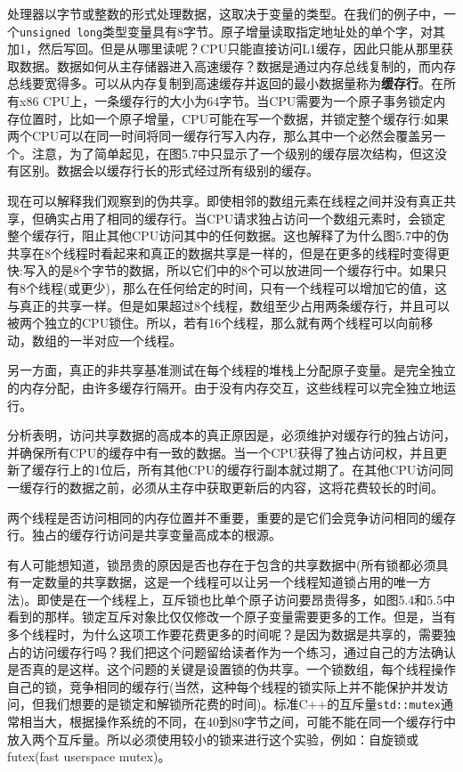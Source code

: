 处理器以字节或整数的形式处理数据，这取决于变量的类型。在我们的例子中，一个\texttt{unsigned long}类型变量具有8字节。原子增量读取指定地址处的单个字，对其加1，然后写回。但是从哪里读呢？CPU只能直接访问L1缓存，因此只能从那里获取数据。数据如何从主存储器进入高速缓存？数据是通过内存总线复制的，而内存总线要宽得多。可以从内存复制到高速缓存并返回的最小数据量称为\textbf{缓存行}。在所有x86 CPU上，一条缓存行的大小为64字节。当CPU需要为一个原子事务锁定内存位置时，比如一个原子增量，CPU可能在写一个数据，并锁定整个缓存行:如果两个CPU可以在同一时间将同一缓存行写入内存，那么其中一个必然会覆盖另一个。注意，为了简单起见，在图5.7中只显示了一个级别的缓存层次结构，但这没有区别。数据会以缓存行长的形式经过所有级别的缓存。

现在可以解释我们观察到的伪共享。即使相邻的数组元素在线程之间并没有真正共享，但确实占用了相同的缓存行。当CPU请求独占访问一个数组元素时，会锁定整个缓存行，阻止其他CPU访问其中的任何数据。这也解释了为什么图5.7中的伪共享在8个线程时看起来和真正的数据共享是一样的，但是在更多的线程时变得更快:写入的是8个字节的数据，所以它们中的8个可以放进同一个缓存行中。如果只有8个线程(或更少)，那么在任何给定的时间，只有一个线程可以增加它的值，这与真正的共享一样。但是如果超过8个线程，数组至少占用两条缓存行，并且可以被两个独立的CPU锁住。所以，若有16个线程，那么就有两个线程可以向前移动，数组的一半对应一个线程。

另一方面，真正的非共享基准测试在每个线程的堆栈上分配原子变量。是完全独立的内存分配，由许多缓存行隔开。由于没有内存交互，这些线程可以完全独立地运行。

分析表明，访问共享数据的高成本的真正原因是，必须维护对缓存行的独占访问，并确保所有CPU的缓存中有一致的数据。当一个CPU获得了独占访问权，并且更新了缓存行上的1位后，所有其他CPU的缓存行副本就过期了。在其他CPU访问同一缓存行的数据之前，必须从主存中获取更新后的内容，这将花费较长的时间。

两个线程是否访问相同的内存位置并不重要，重要的是它们会竞争访问相同的缓存行。独占的缓存行访问是共享变量高成本的根源。

有人可能想知道，锁昂贵的原因是否也存在于包含的共享数据中(所有锁都必须具有一定数量的共享数据，这是一个线程可以让另一个线程知道锁占用的唯一方法)。即使是在一个线程上，互斥锁也比单个原子访问要昂贵得多，如图5.4和5.5中看到的那样。锁定互斥对象比仅仅修改一个原子变量需要更多的工作。但是，当有多个线程时，为什么这项工作要花费更多的时间呢？是因为数据是共享的，需要独占的访问缓存行吗？我们把这个问题留给读者作为一个练习，通过自己的方法确认是否真的是这样。这个问题的关键是设置锁的伪共享。一个锁数组，每个线程操作自己的锁，竞争相同的缓存行(当然，这种每个线程的锁实际上并不能保护并发访问，但我们想要的是锁定和解锁所花费的时间)。标准C++的互斥量\texttt{std::mutex}通常相当大，根据操作系统的不同，在40到80字节之间，可能不能在同一个缓存行中放入两个互斥量。所以必须使用较小的锁来进行这个实验，例如：自旋锁或futex(fast userspace mutex)。

